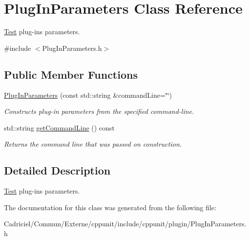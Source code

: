 \hypertarget{class_plug_in_parameters}{\section{Plug\-In\-Parameters Class Reference}
\label{class_plug_in_parameters}
}


\hyperlink{class_test}{Test} plug-\/ins parameters.  




{\ttfamily \#include $<$Plug\-In\-Parameters.\-h$>$}

\subsection*{Public Member Functions}
\begin{DoxyCompactItemize}
\item 
\hypertarget{class_plug_in_parameters_acbf183c92faaa4e17dc66dec87ddc033}{\hyperlink{class_plug_in_parameters_acbf183c92faaa4e17dc66dec87ddc033}{Plug\-In\-Parameters} (const std\-::string \&command\-Line=\char`\"{}\char`\"{})}\label{class_plug_in_parameters_acbf183c92faaa4e17dc66dec87ddc033}

\begin{DoxyCompactList}\small\item\em Constructs plug-\/in parameters from the specified command-\/line. \end{DoxyCompactList}\item 
\hypertarget{class_plug_in_parameters_aad9dfbb3f1745b72154ab6b70948d629}{std\-::string \hyperlink{class_plug_in_parameters_aad9dfbb3f1745b72154ab6b70948d629}{get\-Command\-Line} () const }\label{class_plug_in_parameters_aad9dfbb3f1745b72154ab6b70948d629}

\begin{DoxyCompactList}\small\item\em Returns the command line that was passed on construction. \end{DoxyCompactList}\end{DoxyCompactItemize}


\subsection{Detailed Description}
\hyperlink{class_test}{Test} plug-\/ins parameters. 

The documentation for this class was generated from the following file\-:\begin{DoxyCompactItemize}
\item 
Cadriciel/\-Commun/\-Externe/cppunit/include/cppunit/plugin/Plug\-In\-Parameters.\-h\end{DoxyCompactItemize}
